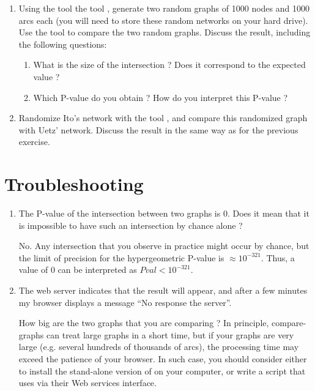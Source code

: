 \begin{enumerate}

\item Using the tool the tool ,
  generate two random graphs of 1000 nodes and 1000 arcs each (you
  will need to store these random networks on your hard drive).  Use
  the tool  to compare the two random
  graphs.
  Discuss the result, including the following questions: 
  \begin{enumerate}
  \item What is the size of the intersection ? Does it correspond to
    the expected value ? 
  \item Which P-value do you obtain ? How do you interpret this P-value ? 
  \end{enumerate}

\item Randomize Ito's network with the tool , and compare this randomized graph with Uetz'
  network. Discuss the result in the same way as for the previous
  exercise.

\end{enumerate}

\section{Troubleshooting}

\begin{enumerate}

\item The P-value of the intersection between two graphs is 0. Does it
  mean that it is impossible to have such an intersection by chance
  alone ?

  No. Any intersection that you observe in practice might occur by
  chance, but the limit of precision for the hypergeometric P-value is
  $\approx 10^{-321}$. Thus, a value of 0 can be interpreted as $Pval <
  10^{-321}.$

\item The web server indicates that the result will appear, and after
  a few minutes my browser displays a message ``No response the
  server''.

  How big are the two graphs that you are comparing ? In principle,
  compare-graphs can treat large graphs in a short time, but if your
  graphs are very large (e.g. several hundreds of thousands of arcs),
  the processing time may exceed the patience of your browser. In such
  case, you should consider either to install the stand-alone version
  of \neat on your computer, or write a script that uses \neat via
  their Web services interface.

\end{enumerate}